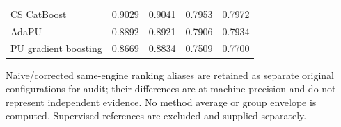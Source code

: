 \begin{table}[t]
\begin{tabularx}{\textwidth}{>{\raggedright\arraybackslash}Xrrrr}
CS CatBoost & 0.9029 & 0.9041 & 0.7953 & 0.7972 \\
AdaPU & 0.8892 & 0.8921 & 0.7906 & 0.7934 \\
PU gradient boosting & 0.8669 & 0.8834 & 0.7509 & 0.7700 \\
\bottomrule
\end{tabularx}
\par\medskip
\begin{minipage}{\textwidth}\small
Naive/corrected same-engine ranking aliases are retained as separate original configurations for audit; their differences are at machine precision and do not represent independent evidence. No method average or group envelope is computed. Supervised references are excluded and supplied separately.
\end{minipage}
\end{table}
